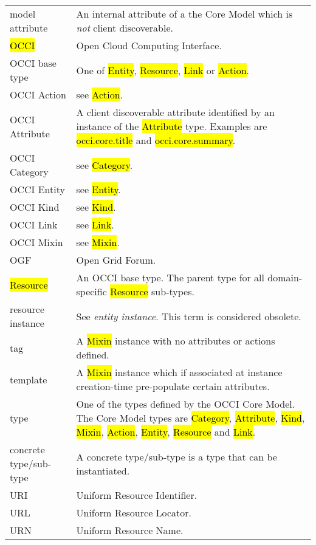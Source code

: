 \begin{tabular}{l|p{12cm}}
model attribute & An internal attribute of a the Core Model which is {\em not}
  client discoverable. \\

\hl{OCCI} & Open Cloud Computing Interface. \\

OCCI base type & One of \hl{Entity}, \hl{Resource}, \hl{Link} or \hl{Action}. \\

OCCI Action & see \hl{Action}. \\
OCCI Attribute & A client discoverable attribute identified by an instance of the \hl{Attribute} type. Examples are \hl{occi.core.title} and \hl{occi.core.summary}. \\
OCCI Category & see \hl{Category}. \\
OCCI Entity & see \hl{Entity}. \\
OCCI Kind & see \hl{Kind}. \\
OCCI Link & see \hl{Link}. \\
OCCI Mixin & see \hl{Mixin}. \\

OGF & Open Grid Forum. \\

\hl{Resource} & An OCCI base type. The parent type for all domain-specific \hl{Resource} sub-types. \\

resource instance & See {\em entity instance}. This term is considered obsolete. \\

tag & A \hl{Mixin} instance with no attributes or actions defined. \\

template & A \hl{Mixin} instance which if associated at instance
creation-time pre-populate certain attributes. \\

type & One of the types defined by the OCCI Core Model.  The Core Model types are
 \hl{Category}, \hl{Attribute},
 \hl{Kind}, \hl{Mixin}, \hl{Action}, \hl{Entity}, \hl{Resource}
 and \hl{Link}. \\

concrete type/sub-type & A concrete type/sub-type is a type that can be instantiated.\\

URI & Uniform Resource Identifier. \\
URL & Uniform Resource Locator. \\
URN & Uniform Resource Name. \\
\end{tabular}
